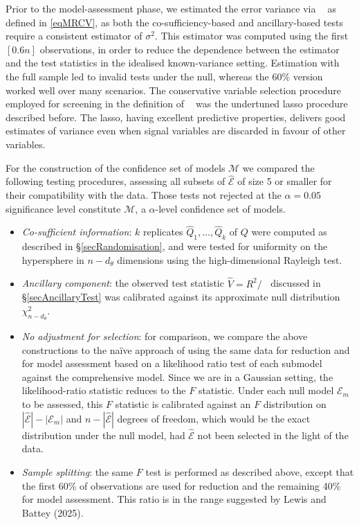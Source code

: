 \documentclass[10pt, reqno]{amsart}
\numberwithin{equation}{section}
\newcommand{\mrcv}{\mathop{\hat{\sigma}^2_{\mathrm{mrcv}}}}
\begin{document}
Prior to the model-assessment phase, we estimated the error variance via $\mrcv$ as defined in \eqref{eqMRCV}, as both the co-sufficiency-based and ancillary-based tests require a consistent estimator of $\sigma^2$. This estimator was computed using the first $[0.6 n]$ observations, in order to reduce the dependence between the estimator and the test statistics in the idealised known-variance setting. Estimation with the full sample led to invalid tests under the null, whereas the 60\% version worked well over many scenarios. The conservative variable selection procedure employed for screening in the definition of $\mrcv$ was the undertuned lasso procedure described before. The lasso, having excellent predictive properties, delivers good estimates of variance even when signal variables are discarded in favour of other variables.

For the construction of the confidence set of models $\mathcal{M}$ we compared the following testing procedures, assessing all subsets of $\hat{\mathcal{E}}$ of size 5 or smaller for their compatibility with the data. Those tests not rejected at the $\alpha= 0.05$ significance level constitute $\mathcal{M}$, a $\alpha$-level confidence set of models. 

\begin{itemize}
	\item \textit{Co-sufficient information}: $k$ replicates $\hat{Q}_1,\ldots, \hat{Q}_k$ of $Q$ were computed as described in \S \ref{secRandomisation}, and were tested for uniformity on the hypersphere in $n-d_\theta$ dimensions using the high-dimensional Rayleigh test.
	\item \textit{Ancillary component}: the observed test statistic $\hat{V} = R^2/\mrcv$ discussed in \S \ref{secAncillaryTest} was calibrated against its approximate null distribution $\chi^2_{n-d_\theta}$.
	\item \textit{No adjustment for selection}: for comparison, we compare the above constructions to the na{\"i}ve approach of using the same data for reduction and for model assessment based on a likelihood ratio test of each submodel against the comprehensive model. Since we are in a Gaussian setting, the likelihood-ratio statistic reduces to the $F$ statistic. Under each null model $\mathcal{E}_m$ to be assessed, this $F$ statistic is calibrated against an $F$ distribution on $|\hat{\mathcal{E}}|-|\mathcal{E}_m|$ and $n-|\hat{\mathcal{E}}|$ degrees of freedom, which would be the exact distribution under the null model, had $\hat{\mathcal{E}}$ not been selected in the light of the data.
	\item \textit{Sample splitting}: the same $F$ test is performed as described above, except that the first 60\% of observations are used for reduction and the remaining 40\% for model assessment. This ratio is in the range suggested by Lewis and Battey (2025).
\end{itemize}
\end{document}
